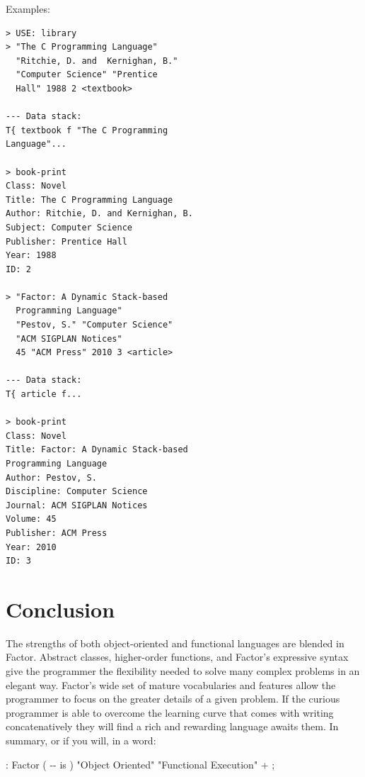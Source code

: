 \documentclass[sigconf]{acmart}
\begin{document}
\begin{enumerate}
\noindent
Examples:

\begin{lstlisting}
> USE: library
> "The C Programming Language"
  "Ritchie, D. and  Kernighan, B."
  "Computer Science" "Prentice 
  Hall" 1988 2 <textbook>

--- Data stack:
T{ textbook f "The C Programming 
Language"...

> book-print
Class: Novel
Title: The C Programming Language
Author: Ritchie, D. and Kernighan, B.
Subject: Computer Science
Publisher: Prentice Hall
Year: 1988
ID: 2

> "Factor: A Dynamic Stack-based 
  Programming Language" 
  "Pestov, S." "Computer Science" 
  "ACM SIGPLAN Notices"
  45 "ACM Press" 2010 3 <article>

--- Data stack:
T{ article f...

> book-print
Class: Novel
Title: Factor: A Dynamic Stack-based 
Programming Language
Author: Pestov, S.
Discipline: Computer Science
Journal: ACM SIGPLAN Notices
Volume: 45
Publisher: ACM Press
Year: 2010
ID: 3
\end{lstlisting}

\end{enumerate}

\section{Conclusion}
The strengths of both object-oriented and functional languages
are blended in Factor. Abstract classes, higher-order functions,
and Factor's expressive syntax give the programmer the 
flexibility needed to solve many complex problems in an elegant 
way. Factor's wide set of mature vocabularies and features allow
the programmer to focus on the greater details of a given problem.
If the curious programmer is able to overcome the learning curve 
that comes with writing concatenatively they will find a rich and 
rewarding language awaits them.  In summary, or if you will, 
in a word:

\begin{center}
\textsf{: Factor ( -{}- is ) "Object Oriented" 
"Functional Execution" +  ;}
\end{center}

\balance


 
\end{document}
